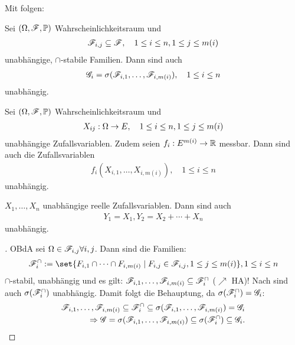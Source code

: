 Mit  folgen:
\begin{conclusion}
	Sei $(\Omega,\mathscr F,\mathbb{P})$ Wahrscheinlichkeitsraum und
	\begin{align*}
		\mathscr F_{i,j} \subseteq \mathscr F, \quad 1 \le i \le n, 1 \le j \le m(i)
	\end{align*}
	unabhängige, $\cap$-stabile Familien.
	Dann sind auch
	\begin{align*}
		\mathscr{G}_i = \sigma(\mathscr F_{i,1}, \dots , \mathscr F_{i,m(i)}), \quad 1 \le i \le n
	\end{align*}
	unabhängig.
\end{conclusion}
\begin{conclusion}
	Sei $(\Omega,\mathscr F,\mathbb{P})$ Wahrscheinlichkeitsraum und
	\begin{align*}
		X_{ij}: \Omega \to E, \quad 1 \le i \le n, 1 \le j \le m(i)
	\end{align*}
	unabhängige Zufallsvariablen. Zudem seien $f_i: E^{m(i)} \to \mathbb{R}$ messbar. Dann sind auch die Zufallsvariablen
	\begin{align*}
		f_i(X_{i,1}, \dots, X_{i,m(i)}), \quad 1 \le i \le n
	\end{align*}
	unabhängig.
\end{conclusion}
\begin{example}
	$X_1, \dots, X_n$ unabhängige reelle Zufallsvariablen. Dann sind auch
	\begin{align*}
	Y_1 = X_1, Y_2 = X_2 + \cdots + X_n
	\end{align*}
	unabhängig.
\end{example}
\begin{proof}[]
	OBdA sei $\Omega \in \mathscr F_{i,j} \forall i,j$. Dann sind die Familien:
	\begin{align*}
		\F_i^{\cap} := \set{F_{i,1} \cap \dots \cap F_{i,m(i)} \mid F_{i,j} \in \F_{i,j}, 1 \le j \le m(i)}, 1 \le i \le n
	\end{align*}
	$\cap$-stabil, unabhängig und es gilt: $\mathscr F_{i,1}, \dots, \mathscr F_{i,m(i)} \subseteq \mathscr F_i^{\cap}$ ($\nearrow$ HA)! Nach  sind auch $\sigma(\mathscr F_i^{\cap})$ unabhängig. Damit folgt die Behauptung, da $\sigma(\mathscr F_i^{\cap}) = \mathscr{G}_i$:
	\begin{align*}
		\mathscr F_{i,1}, \dots, \mathscr F_{i,m(i)} \subseteq \mathscr F_i^{\cap} \subseteq \sigma(\mathscr F_{i,1}, \dots, \mathscr F_{i,m(i)}) = \mathscr{G}_i\\
		\Rightarrow \mathscr{G} = \sigma(\mathscr F_{i,1}, \dots, \mathscr F_{i,m(i)}) \subseteq \sigma(\mathscr F_i^{\cap}) \subseteq \mathscr{G}_i.
	\end{align*}
\end{proof}
